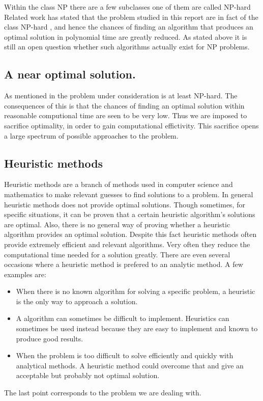Within the class NP there are a few subclasses one of them are called NP-hard 
Related work has stated that the problem studied in this report are in fact of the class NP-hard \cite{paper1}, %
and hence the chances of finding an algorithm that produces an optimal solution in polynomial time are greatly reduced. As stated above it is still an open question whether such algorithms actually exist for NP problems. 

\subsection{A near optimal solution.}
As mentioned in \cite{paper1} the problem under consideration is at least NP-hard. The consequences of this is that the chances of finding an optimal solution within reasonable computional time are seen to be very low. Thus we are imposed to sacrifice optimality, in order to gain computational effictivity. This sacrifice opens a large spectrum of possible approaches to the problem.


\subsection{Heuristic methods}
Heuristic methods are a branch of methods used in computer science and mathematics to make relevant guesses to find solutions to a problem. In general heuristic methods does not provide optimal solutions. Though sometimes, for specific situations, it can be proven that a certain heuristic algorithm's solutions are optimal. Also, there is no general way of proving whether a heuristic algorithm provides an optimal solution. Despite this fact heuristic methods often provide extremely efficient and relevant algorithms. Very often they reduce the computational time needed for a solution greatly. There are even several occasions where a heuristic method is prefered to an analytic method. A few examples are:
\begin{itemize}
\item When there is no known algorithm for solving a specific problem, a heuristic is the only way to approach a solution.
\item A algorithm can sometimes be difficult to implement. Heuristics can sometimes be used instead because they are easy to implement and known to produce good results.
\item When the problem is too difficult to solve efficiently and quickly with analytical methods. A heuristic method could overcome that and give an acceptable but probably not optimal solution.
\end{itemize}

The last point corresponds to the problem we are dealing with.